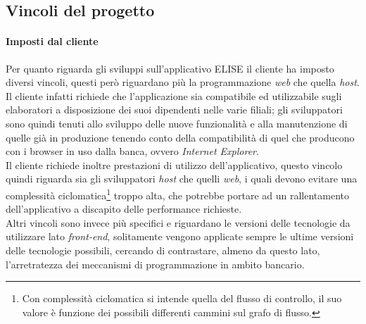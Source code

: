 \subsection{Vincoli del progetto}
	
	\paragraph{Imposti dal cliente}
	\leavevmode	\newline
	\leavevmode	\newline
	Per quanto riguarda gli sviluppi sull'applicativo ELISE il cliente ha imposto diversi vincoli, questi però riguardano più la programmazione \textit{web} che quella \textit{host}.\\
	
	Il cliente infatti richiede che l'applicazione sia compatibile ed utilizzabile sugli elaboratori a disposizione dei suoi dipendenti nelle varie filiali; gli sviluppatori sono quindi tenuti allo sviluppo delle nuove funzionalità e alla manutenzione di quelle già in produzione tenendo conto della compatibilità di quel che producono con i browser in uso dalla banca, ovvero \textit{Internet Explorer}.\\
	
	Il cliente richiede inoltre prestazioni di utilizzo dell'applicativo, questo vincolo quindi riguarda sia gli sviluppatori \textit{host} che quelli \textit{web}, i quali devono evitare una complessità ciclomatica\footnote{Con complessità ciclomatica si intende quella del flusso di controllo, il suo valore è funzione dei possibili differenti cammini sul grafo di flusso.} troppo alta, che potrebbe portare ad un rallentamento dell'applicativo a discapito delle performance richieste.\\

	Altri vincoli sono invece più specifici e riguardano le versioni delle tecnologie da utilizzare lato \textit{front-end}, solitamente vengono applicate sempre le ultime versioni delle tecnologie possibili, cercando di contrastare, almeno da questo lato, l'arretratezza dei meccanismi di programmazione in ambito bancario.

